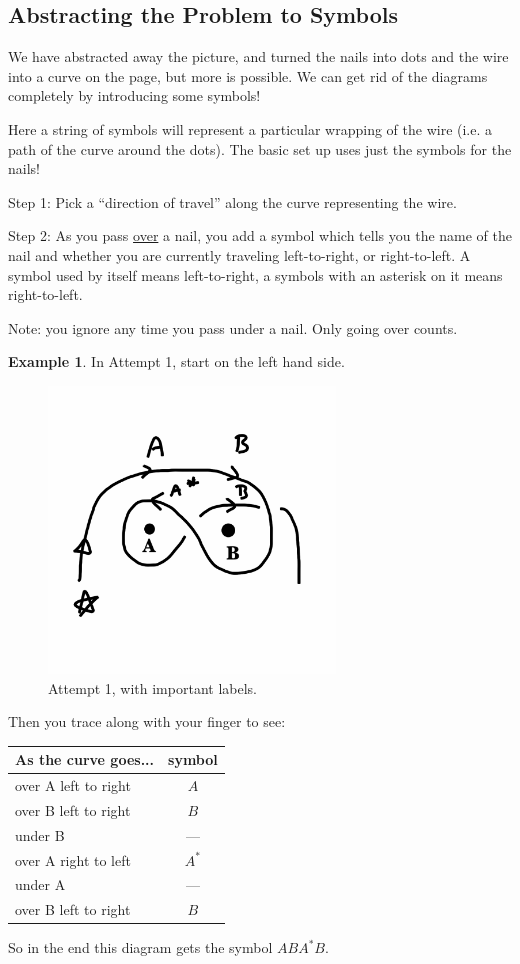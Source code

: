 \documentclass[12pt,letterpaper]{article}
\theoremstyle{definition}
\newtheorem{example}{Example}
\begin{document}
\clearpage
\subsection*{Abstracting the Problem to Symbols}

We have abstracted away the picture, and turned the nails into dots and the wire into a curve on the page, but more is possible.
We can get rid of the diagrams completely by introducing some symbols!

Here a string of symbols will represent a particular wrapping of the wire (i.e. a path of the curve around the dots).
The basic set up uses just the symbols for the nails!

\noindent
Step 1: Pick a ``direction of travel'' along the curve representing the wire.

\noindent
Step 2: As you pass \underline{over} a nail, you add a symbol which tells you the name of the nail and whether you are currently traveling left-to-right, or right-to-left. A symbol used by itself means left-to-right, a symbols with an asterisk on it means right-to-left.

Note: you ignore any time you pass under a nail. Only going over counts.

\begin{example}
In Attempt 1, start on the left hand side.
\begin{figure}[h]
    \centering
    \includegraphics[height=3in]{rgp01pics/coded.png}
    \caption{Attempt 1, with important labels.}
\end{figure}
Then you trace along with your finger to see:\\
\begin{center}
\begin{tabular}{lc}
As the curve goes... & symbol \\
\hline
over A left to right & $A$\\
over B left to right & $B$\\
under B & --- \\
over A right to left & $A^*$\\
under A & --- \\
over B left to right & $B$ 
\end{tabular}
\end{center}
So in the end this diagram gets the symbol $ABA^*B$.
\end{example}
\end{document}
